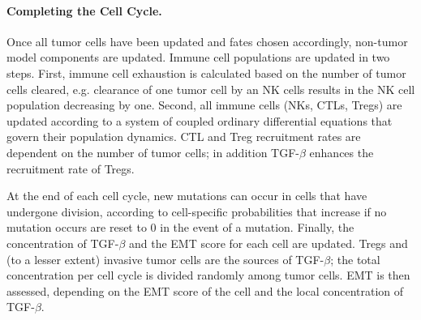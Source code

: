 \documentclass[11pt]{article}
\begin{document}


\paragraph{Completing the Cell Cycle.}
Once all tumor cells have been updated and fates chosen accordingly, non-tumor model components are updated. Immune cell populations are updated in two steps. First, immune cell exhaustion is calculated based on the number of tumor cells cleared, e.g. clearance of one tumor cell by an NK cells results in the NK cell population decreasing by one. Second, all immune cells (NKs, CTLs, Tregs) are updated according to a system of coupled ordinary differential equations that govern their population dynamics. CTL and Treg recruitment rates are dependent on the number of tumor cells; in addition  TGF-$\beta$ enhances the recruitment rate of Tregs.
\par
At the end of each cell cycle, new mutations can occur in cells that have undergone division, according to cell-specific probabilities that increase if no mutation occurs are reset to 0 in the event of a mutation. Finally, the concentration of TGF-$\beta$ and the EMT score for each cell are updated. Tregs and (to a lesser extent) invasive tumor cells are the sources of TGF-$\beta$; the total concentration per cell cycle is divided randomly among tumor cells. EMT is then assessed, depending on the EMT score of the cell and the local concentration of TGF-$\beta$.
\end{document}
